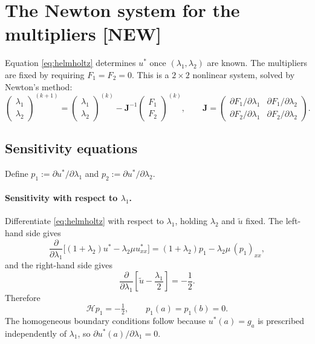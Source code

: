 \documentclass[11pt,a4paper]{article}
\theoremstyle{remark}
\newcommand{\ut}{\tilde{u}}
\newcommand{\us}{u^{*}}
\begin{document}
\section{The Newton system for the multipliers \textbf{[NEW]}}

Equation \eqref{eq:helmholtz} determines $\us$ once $(\lambda_1,\lambda_2)$ are
known. The multipliers are fixed by requiring $F_1 = F_2 = 0$. This is a
$2\times 2$ nonlinear system, solved by Newton's method:
\begin{equation}
\begin{pmatrix}\lambda_1\\\lambda_2\end{pmatrix}^{(k+1)}
=
\begin{pmatrix}\lambda_1\\\lambda_2\end{pmatrix}^{(k)}
- \bm{J}^{-1}
\begin{pmatrix}F_1\\F_2\end{pmatrix}^{(k)},
\qquad
\bm{J} = \begin{pmatrix}
\partial F_1/\partial\lambda_1 & \partial F_1/\partial\lambda_2 \\
\partial F_2/\partial\lambda_1 & \partial F_2/\partial\lambda_2
\end{pmatrix}.
\end{equation}

\subsection{Sensitivity equations}

Define $p_1 := \partial\us/\partial\lambda_1$ and
$p_2 := \partial\us/\partial\lambda_2$.

\paragraph{Sensitivity with respect to $\lambda_1$.}
Differentiate \eqref{eq:helmholtz} with respect to $\lambda_1$, holding
$\lambda_2$ and $\ut$ fixed. The left-hand side gives
\begin{equation}
\frac{\partial}{\partial\lambda_1}\Big[(1+\lambda_2)\us - \lambda_2\mu\us_{xx}\Big]
= (1+\lambda_2)p_1 - \lambda_2\mu\,(p_1)_{xx},
\end{equation}
and the right-hand side gives
\begin{equation}
\frac{\partial}{\partial\lambda_1}\left[\ut - \frac{\lambda_1}{2}\right] = -\frac12 .
\end{equation}
Therefore
\begin{equation}
\boxed{\ \mathcal{H}p_1 = -\tfrac12, \qquad p_1(a) = p_1(b) = 0. \ }
\label{eq:p1}
\end{equation}
The homogeneous boundary conditions follow because $\us(a) = g_a$ is prescribed
independently of $\lambda_1$, so $\partial\us(a)/\partial\lambda_1 = 0$.
\end{document}
